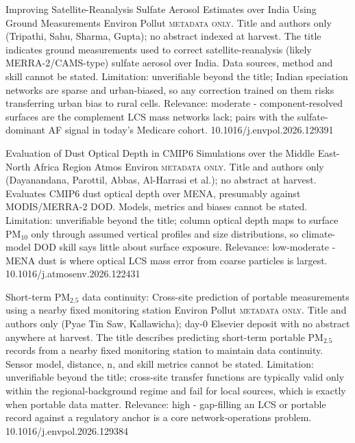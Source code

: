 \documentclass[10pt]{article}
\begin{document}
{Improving Satellite-Reanalysis Sulfate Aerosol Estimates over India Using Ground Measurements}
{Environ Pollut}
{\textsc{metadata only.} Title and authors only (Tripathi, Sahu, Sharma, Gupta); no abstract indexed at harvest. The title indicates ground measurements used to correct satellite-reanalysis (likely MERRA-2/CAMS-type) sulfate aerosol over India. Data sources, method and skill cannot be stated. Limitation: unverifiable beyond the title; Indian speciation networks are sparse and urban-biased, so any correction trained on them risks transferring urban bias to rural cells. Relevance: moderate - component-resolved surfaces are the complement LCS mass networks lack; pairs with the sulfate-dominant AF signal in today's Medicare cohort.}
{10.1016/j.envpol.2026.129391}

{Evaluation of Dust Optical Depth in CMIP6 Simulations over the Middle East-North Africa Region}
{Atmos Environ}
{\textsc{metadata only.} Title and authors only (Dayanandana, Parottil, Abbas, Al-Harrasi et al.); no abstract at harvest. Evaluates CMIP6 dust optical depth over MENA, presumably against MODIS/MERRA-2 DOD. Models, metrics and biases cannot be stated. Limitation: unverifiable beyond the title; column optical depth maps to surface PM$_{10}$ only through assumed vertical profiles and size distributions, so climate-model DOD skill says little about surface exposure. Relevance: low-moderate - MENA dust is where optical LCS mass error from coarse particles is largest.}
{10.1016/j.atmosenv.2026.122431}

\par{}\baselineskip{}\baselineskip
{}

{Short-term PM$_{2.5}$ data continuity: Cross-site prediction of portable measurements using a nearby fixed monitoring station}
{Environ Pollut}
{\textsc{metadata only.} Title and authors only (Pyae Tin Saw, Kallawicha); day-0 Elsevier deposit with no abstract anywhere at harvest. The title describes predicting short-term portable PM$_{2.5}$ records from a nearby fixed monitoring station to maintain data continuity. Sensor model, distance, n, and skill metrics cannot be stated. Limitation: unverifiable beyond the title; cross-site transfer functions are typically valid only within the regional-background regime and fail for local sources, which is exactly when portable data matter. Relevance: high - gap-filling an LCS or portable record against a regulatory anchor is a core network-operations problem.}
{10.1016/j.envpol.2026.129384}
\end{document}
